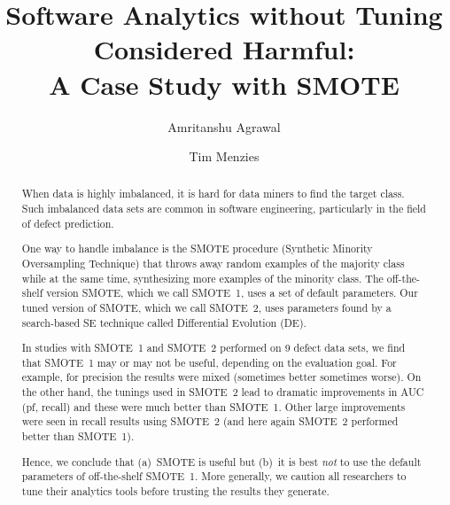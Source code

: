 \documentclass[sigconf,review, anonymous]{acmart}
\theoremstyle{break}
\theoremstyle{break}
\begin{document}

\title{Software Analytics
without Tuning Considered Harmful:\\A
Case Study with SMOTE}

\author{Amritanshu Agrawal}

\author{Tim Menzies}



\begin{abstract}
When data is highly imbalanced, it is
hard for data miners to find the target
class. Such imbalanced data sets are
common in software engineering,
particularly in the field of defect prediction.


One way to handle imbalance is the SMOTE procedure (Synthetic Minority Oversampling Technique) that 
throws away random examples of the majority
class while at the same time, synthesizing
more examples 
of the minority class.
The off-the-shelf version SMOTE,
which we call SMOTE~1,
uses a set of default parameters. Our tuned version
of SMOTE, which we call SMOTE~2,
uses parameters  found by a search-based SE technique
called Differential Evolution (DE). 

In studies with SMOTE~1 and SMOTE~2 performed on
 9 defect data sets, we find that SMOTE~1 may or may not be useful, depending on the evaluation goal. For example,
 for precision the results were mixed (sometimes better sometimes worse).
On the other hand, the tunings
used in SMOTE~2 lead to dramatic improvements in  AUC (pf, recall) and these were 
much better than SMOTE~1. Other large improvements were seen in recall results using SMOTE~2 (and here again SMOTE~2 performed better than SMOTE~1).

Hence, we conclude that (a)~SMOTE
is useful but (b)~it is best {\em not} to use the default parameters of off-the-shelf SMOTE~1. More generally, we caution all researchers to tune their analytics tools before
trusting the results they generate.
\end{abstract}


\maketitle
\end{document}
